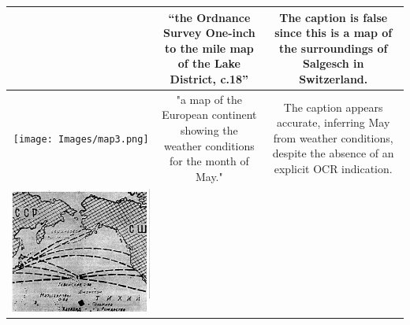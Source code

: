 \begin{table}[h]
\begin{tabular}{c|c|c}
\begin{minipage}[c]{4cm}
        \end{minipage} & 
        \begin{minipage}[c]{0.3\linewidth}
            “the Ordnance Survey One-inch to the mile map of the Lake District, c.18”
        \end{minipage} &
        \begin{minipage}[c]{0.3\linewidth}
            The caption is false since this is a map of the surroundings of Salgesch in Switzerland.
        \end{minipage} \\
        \hline
        \begin{minipage}[c]{4cm}
            \texttt{[image: Images/map3.png]}
        \end{minipage} & 
        \begin{minipage}[c]{0.3\linewidth}
            "a map of the European continent showing the weather conditions for the month of May."
        \end{minipage} & 
        \begin{minipage}[c]{0.3\linewidth}
           The caption appears accurate, inferring May from weather conditions, despite the absence of an explicit OCR indication.
        \end{minipage} \\
        \hline
        \begin{minipage}[c]{4cm}
            \includegraphics[width=\linewidth]{Images/map4.png}

\end{minipage}
\end{tabular}
\end{table}
